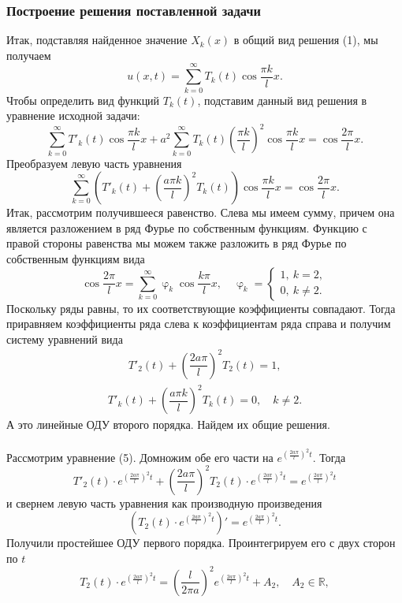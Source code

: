 \documentclass[a4paper, 12pt]{report}
\newcommand{\Rm}{\mathbb{R}}
\renewcommand{\phi}{\upvarphi}
\begin{document}
	\subsubsection*{Построение решения поставленной задачи}
	Итак, подставляя найденное значение $X_k(x)$ в общий вид решения (1), мы получаем $$u(x,t) = \sum_{k=0}^{\infty} T_k(t)  \cos \dfrac{\pi k}{l} x.$$ Чтобы определить вид функций $T_k(t)$, подставим данный вид решения в уравнение исходной задачи:
	$$\sum_{k=0}^\infty T'_k(t) \cos \dfrac{\pi k}{l}x + a^2 \sum_{k=0}^\infty T_k(t) \left(\dfrac{\pi k}{l}\right)^2 \cos \dfrac{\pi k}{l}x = \cos \dfrac{2\pi}{l}x.$$
	Преобразуем левую часть уравнения
	$$\sum_{k=0}^\infty\left( T'_k(t)  + \left(\dfrac{a\pi k}{l}\right)^2 T_k(t) \right) \cos \dfrac{\pi k}{l}x = \cos \dfrac{2\pi}{l}x.$$
	Итак, рассмотрим получившееся равенство. Слева мы имеем сумму, причем она является разложением в ряд Фурье по собственным функциям. Функцию с правой стороны равенства мы можем также разложить в ряд Фурье по собственным функциям вида $$\cos \dfrac{2\pi}{l}x = \sum_{k=0}^{\infty} \phi_k \cos \dfrac{k\pi}{l}x,\quad \phi_k = \begin{cases}
		1, \ k = 2,\\
		0, \ k \ne 2.
	\end{cases}$$
	Поскольку ряды равны, то их соответствующие коэффициенты совпадают. Тогда приравняем коэффициенты ряда слева к коэффициентам ряда справа и получим систему уравнений вида
	\begin{eqnarray}
		T'_2(t)  + \left(\dfrac{2a\pi }{l}\right)^2 T_2(t) = 1,
	\end{eqnarray}
	\begin{eqnarray}
		T'_k(t)  + \left(\dfrac{a\pi k}{l}\right)^2 T_k(t) = 0,\quad k \ne 2.
	\end{eqnarray}
	А это линейные ОДУ второго порядка. Найдем их общие решения.\\\\
	Рассмотрим уравнение (5). Домножим обе его части на $e^{\left(\frac{2a\pi}{l}\right)^2t}$. Тогда
	$$T'_2(t)\cdot e^{\left(\frac{2a\pi}{l}\right)^2t}  + \left(\dfrac{2a\pi }{l}\right)^2 T_2(t)\cdot e^{\left(\frac{2a\pi}{l}\right)^2t} = e^{\left(\frac{2a\pi}{l}\right)^2t}$$
	и свернем левую часть уравнения как производную произведения
	$$\left(T_2(t)\cdot e^{\left(\frac{2a\pi}{l}\right)^2t}\right)' = e^{\left(\frac{2a\pi}{l}\right)^2t}.$$
	Получили простейшее ОДУ первого порядка. Проинтегрируем его с двух сторон по $t$ 
	$$T_2(t)\cdot e^{\left(\frac{2a\pi}{l}\right)^2t} = \left(\dfrac{l}{2\pi a}\right)^2 e^{\left(\frac{2a\pi}{l}\right)^2t} + A_2,\quad A_2 \in \Rm,$$
\end{document}
